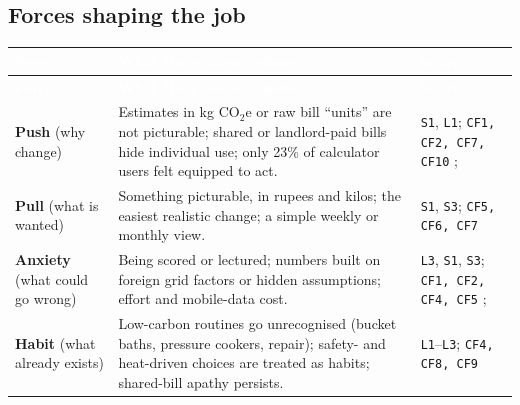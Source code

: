 \documentclass[12pt, a4paper]{article}
\newcommand{\co}{CO$_2$e}
\begin{document}
\subsection{Forces shaping the job}
{\footnotesize
{}
\begin{longtable}{|>{\raggedright\arraybackslash}p{2.2cm}|>{\raggedright\arraybackslash}p{9.0cm}|>{\raggedright\arraybackslash}p{4.4cm}|}
\hline
\rowcolor{cNavy}
\textcolor{white}{\textbf{Force}} & \textcolor{white}{\textbf{What the evidence shows}} & \textcolor{white}{\textbf{Source}} \\
\hline
\endfirsthead
\hline
\rowcolor{cNavy}
\textcolor{white}{\textbf{Force}} & \textcolor{white}{\textbf{What the evidence shows}} & \textcolor{white}{\textbf{Source}} \\
\hline
\endhead
\hline
\endfoot
\textbf{Push} (why change) & Estimates in kg \co{} or raw bill ``units'' are not picturable; shared or landlord-paid bills hide individual use; only 23\% of calculator users felt equipped to act. & \texttt{S1}, \texttt{L1}; \texttt{CF1, CF2, CF7, CF10} \cite{cf1, cf2, cf7, cf10}; \cite{collins2020} \\
\hline
\textbf{Pull} (what is wanted) & Something picturable, in rupees and kilos; the easiest realistic change; a simple weekly or monthly view. & \texttt{S1}, \texttt{S3}; \texttt{CF5, CF6, CF7} \cite{cf5, cf6, cf7} \\
\hline
\textbf{Anxiety} (what could go wrong) & Being scored or lectured; numbers built on foreign grid factors or hidden assumptions; effort and mobile-data cost. & \texttt{L3}, \texttt{S1}, \texttt{S3}; \texttt{CF1, CF2, CF4, CF5} \cite{cf1, cf2, cf4, cf5}; \cite{brynjarsdottir2012} \\
\hline
\textbf{Habit} (what already exists) & Low-carbon routines go unrecognised (bucket baths, pressure cookers, repair); safety- and heat-driven choices are treated as habits; shared-bill apathy persists. & \texttt{L1}--\texttt{L3}; \texttt{CF4, CF8, CF9} \cite{cf4, cf8, cf9} \\
\hline
\end{longtable}
}
\end{document}

